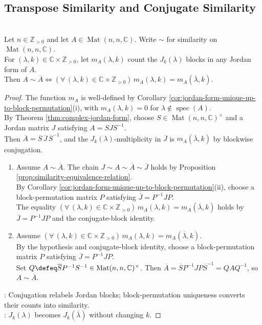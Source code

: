 \subsection{Transpose Similarity and Conjugate Similarity}

\begin{theorem} \label{thm:conjugate-similarity-jordan-block-criterion} \\
Let $n\in\mathbb{Z}_{>0}$ and let $A\in\operatorname{Mat}(n,n,\mathbb{C})$. Write $\sim$ for similarity on $\operatorname{Mat}(n,n,\mathbb{C})$.\\
For $(\lambda,k)\in\mathbb{C}\times\mathbb{Z}_{>0}$, let $m_A(\lambda,k)$ count the $J_k(\lambda)$ blocks in any Jordan form of $A$.\\
Then $A\sim\overline{A}\iff(\forall\,(\lambda,k)\in\mathbb{C}\times\mathbb{Z}_{>0})\,m_A(\lambda,k)=m_A(\overline{\lambda},k)$.
\begin{proof}
The function $m_A$ is well-defined by Corollary \ref{cor:jordan-form-unique-up-to-block-permutation}(i), with $m_A(\lambda,k)=0$ for $\lambda\notin\operatorname{spec}(A)$.\\
By Theorem \ref{thm:complex-jordan-form}, choose $S\in\operatorname{Mat}(n,n,\mathbb{C})^\times$ and a Jordan matrix $J$ satisfying $A=SJS^{-1}$.\\
Then $\overline{A}=\overline{S}\,\overline{J}\,\overline{S}^{-1}$, and the $J_k(\lambda)$-multiplicity in $\overline{J}$ is $m_A(\overline{\lambda},k)$ by blockwise conjugation.
\begin{enumerate}[label=\roman*.]
\setlength{\itemsep}{0pt}
\item[$(\Rightarrow)$] Assume $A\sim\overline{A}$. The chain $J\sim A\sim\overline{A}\sim\overline{J}$ holds by Proposition \ref{prop:similarity-equivalence-relation}.\\
By Corollary \ref{cor:jordan-form-unique-up-to-block-permutation}(ii), choose a block-permutation matrix $P$ satisfying $\overline{J}=P^{-1}JP$.\\
The equality $(\forall\,(\lambda,k)\in\mathbb{C}\times\mathbb{Z}_{>0})\,m_A(\lambda,k)=m_A(\overline{\lambda},k)$ holds by $\overline{J}=P^{-1}JP$ and the conjugate-block identity.
\item[$(\Leftarrow)$] Assume $(\forall\,(\lambda,k)\in\mathbb{C}\times\mathbb{Z}_{>0})\,m_A(\lambda,k)=m_A(\overline{\lambda},k)$.\\
By the hypothesis and conjugate-block identity, choose a block-permutation matrix $P$ satisfying $\overline{J}=P^{-1}JP$.\\
Set $Q\defeq\overline{S}P^{-1}S^{-1}\in\operatorname{Mat}(n,n,\mathbb{C})^\times$. Then $\overline{A}=\overline{S}P^{-1}JP\overline{S}^{-1}=QAQ^{-1}$, so $A\sim\overline{A}$.
\end{enumerate}
: Conjugation relabels Jordan blocks; block-permutation uniqueness converts their counts into similarity.\\
: $J_k(\lambda)$ becomes $J_k(\overline{\lambda})$ without changing $k$.
\end{proof}
\end{theorem}

